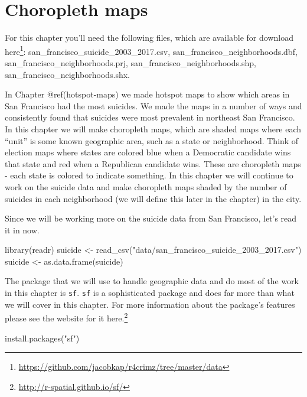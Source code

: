 \documentclass[
  a4paper,
]{krantz}
\makeatletter
\newenvironment{Shaded}{\begin{snugshade}}{\end{snugshade}}
\newcommand{\FunctionTok}[1]{\textcolor[rgb]{0.00,0.00,0.00}{#1}}
\newcommand{\NormalTok}[1]{#1}
\newcommand{\OtherTok}[1]{\textcolor[rgb]{0.56,0.35,0.01}{#1}}
\newcommand{\StringTok}[1]{\textcolor[rgb]{0.31,0.60,0.02}{#1}}
\renewcommand{\href}[2]{#2\footnote{\url{#1}}}
\newenvironment{kframe}{%
\medskip{}
\setlength{\fboxsep}{.8em}
 \def\at@end@of@kframe{}%
 \ifinner\ifhmode%
  \def\at@end@of@kframe{\end{minipage}}%
  \begin{minipage}{\columnwidth}%
 \fi\fi%
 \def\FrameCommand##1{\hskip\@totalleftmargin \hskip-\fboxsep
 \colorbox{shadecolor}{##1}\hskip-\fboxsep
     \hskip-\linewidth \hskip-\@totalleftmargin \hskip\columnwidth}%
 \MakeFramed {\advance\hsize-\width
   \@totalleftmargin\z@ \linewidth\hsize
   \@setminipage}}%
 {\par\unskip\endMakeFramed%
 \at@end@of@kframe}
\renewenvironment{Shaded}{\begin{kframe}}{\end{kframe}}
\makeatother
\begin{document}
\hypertarget{choropleth-maps}{%
\chapter{Choropleth maps}\label{choropleth-maps}}

For this chapter you'll need the following files, which are
available for download
\href{https://github.com/jacobkap/r4crimz/tree/master/data}{here}:
san\_francisco\_suicide\_2003\_2017.csv,
san\_francisco\_neighborhoods.dbf,
san\_francisco\_neighborhoods.prj,
san\_francisco\_neighborhoods.shp,
san\_francisco\_neighborhoods.shx.

In Chapter @ref(hotspot-maps) we made hotspot maps to show
which areas in San Francisco had the most suicides. We made
the maps in a number of ways and consistently found that
suicides were most prevalent in northeast San Francisco. In
this chapter we will make choropleth maps, which are shaded
maps where each ``unit'' is some known geographic area, such
as a state or neighborhood. Think of election maps where
states are colored blue when a Democratic candidate wins
that state and red when a Republican candidate wins. These
are choropleth maps - each state is colored to indicate
something. In this chapter we will continue to work on the
suicide data and make choropleth maps shaded by the number
of suicides in each neighborhood (we will define this later
in the chapter) in the city.

Since we will be working more on the suicide data from San
Francisco, let's read it in now.

\begin{Shaded}
\begin{Highlighting}[]
\FunctionTok{library}\NormalTok{(readr)}
\NormalTok{suicide }\OtherTok{\textless{}{-}} \FunctionTok{read\_csv}\NormalTok{(}\StringTok{"data/san\_francisco\_suicide\_2003\_2017.csv"}\NormalTok{)}
\NormalTok{suicide }\OtherTok{\textless{}{-}} \FunctionTok{as.data.frame}\NormalTok{(suicide)}
\end{Highlighting}
\end{Shaded}

The package that we will use to handle geographic data and
do most of the work in this chapter is \texttt{sf}.
\texttt{sf} is a sophisticated package and does far more
than what we will cover in this chapter. For more
information about the package's features please see the
website for it \href{http://r-spatial.github.io/sf/}{here.}

\begin{Shaded}
\begin{Highlighting}[]
\FunctionTok{install.packages}\NormalTok{(}\StringTok{"sf"}\NormalTok{)}
\end{Highlighting}
\end{Shaded}
\end{document}
